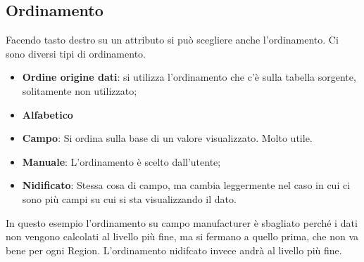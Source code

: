 \subsection{Ordinamento}
Facendo tasto destro su un attributo si può scegliere anche l'ordinamento. Ci sono diversi tipi di ordinamento.
\begin{itemize}
	\item \textbf{Ordine origine dati}: si utilizza l'ordinamento che c'è sulla tabella sorgente, solitamente non utilizzato;
	\item \textbf{Alfabetico}
	\item \textbf{Campo}: Si ordina sulla base di un valore visualizzato. Molto utile.
	\item \textbf{Manuale}: L'ordinamento è scelto dall'utente;
	\item \textbf{Nidificato}: Stessa cosa di campo, ma cambia leggermente nel caso in cui ci sono più campi su cui si sta visualizzando il dato.
\end{itemize}
\noindent In questo esempio l'ordinamento su campo manufacturer è sbagliato perché i dati non vengono calcolati al livello più fine, ma si fermano a quello prima, che non va bene per ogni Region. L'ordinamento nidifcato invece andrà al livello più fine.
